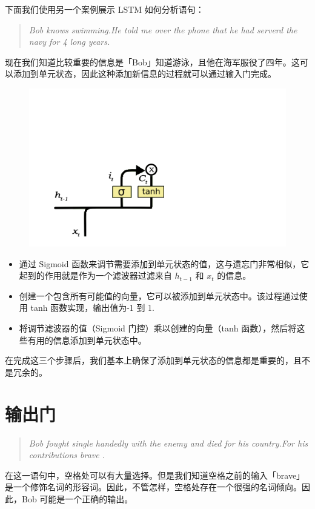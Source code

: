 \documentclass{article}
\begin{document}
下面我们使用另一个案例展示 LSTM 如何分析语句：
\begin{quote}
	\emph{Bob knows swimming.He told me over the phone that he had serverd the navy for 4 long years.}
\end{quote}
现在我们知道比较重要的信息是「Bob」知道游泳，且他在海军服役了四年。这可以添加到单元状态，因此这种添加新信息的过程就可以通过输入门完成。
\begin{figure}[H]
	\centering
	\includegraphics[scale=0.3]{4.png}
\end{figure}
\begin{itemize}
	\item     通过 Sigmoid 函数来调节需要添加到单元状态的值，这与遗忘门非常相似，它起到的作用就是作为一个滤波器过滤来自 $h_{t-1}$ 和 $x_t$ 的信息。

\item     创建一个包含所有可能值的向量，它可以被添加到单元状态中。该过程通过使用 tanh 函数实现，输出值为-1 到 1.

\item     将调节滤波器的值（Sigmoid 门控）乘以创建的向量（tanh 函数），然后将这些有用的信息添加到单元状态中。
\end{itemize}
在完成这三个步骤后，我们基本上确保了添加到单元状态的信息都是重要的，且不是冗余的。
\section{ 输出门}
\begin{quote}
	\emph{Bob fought single handedly with the enemy and died for his country.For his contributions brave .}
\end{quote}
在这一语句中，空格处可以有大量选择。但是我们知道空格之前的输入「brave」是一个修饰名词的形容词。因此，不管怎样，空格处存在一个很强的名词倾向。因此，Bob 可能是一个正确的输出。
\end{document}
